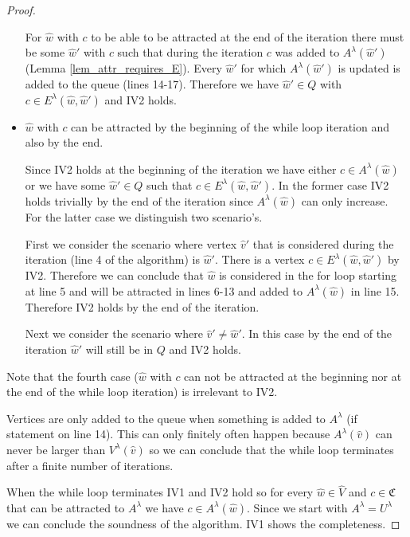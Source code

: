 \begin{theorem}
\begin{proof}
\begin{itemize}
			For $\hat{w}$ with $c$ to be able to be attracted at the end of the iteration there must be some $\hat{w}'$ with $c$ such that during the iteration $c$ was added to $A^\lambda(\hat{w}')$ (Lemma \ref{lem_attr_requires_E}). Every $\hat{w}'$ for which $A^\lambda(\hat{w}')$ is updated is added to the queue (lines 14-17). Therefore we have $\hat{w}' \in Q$ with $c \in E^\lambda(\hat{w},\hat{w}')$ and IV2 holds.
			\item $\hat{w}$ with $c$ can be attracted by the beginning of the while loop iteration and also by the end.
			
			Since IV2 holds at the beginning of the iteration we have either $c \in A^\lambda(\hat{w})$ or we have some $\hat{w}' \in Q$ such that $c \in E^\lambda(\hat{w},\hat{w}')$. In the former case IV2 holds trivially by the end of the iteration since $A^\lambda(\hat{w})$ can only increase. For the latter case we distinguish two scenario's. 
			
			First we consider the scenario where vertex $\hat{v}'$ that is considered during the iteration (line 4 of the algorithm) is $\hat{w}'$. There is a vertex $c \in E^\lambda(\hat{w},\hat{w}')$ by IV2. Therefore we can conclude that $\hat{w}$ is considered in the for loop starting at line 5 and will be attracted in lines 6-13 and added to $A^\lambda(\hat{w})$ in line 15. Therefore IV2 holds by the end of the iteration.
			
			Next we consider the scenario where $\hat{v}' \neq \hat{w}'$. In this case by the end of the iteration $\hat{w}'$ will still be in $Q$ and IV2 holds.
		\end{itemize}
		Note that the fourth case ($\hat{w}$ with $c$ can not be attracted at the beginning nor at the end of the while loop iteration) is irrelevant to IV2.
	
		Vertices are only added to the queue when something is added to $A^\lambda$ (if statement on line 14). This can only finitely often happen because $A^\lambda(\hat{v})$ can never be larger than $V^\lambda(\hat{v})$ so we can conclude that the while loop terminates after a finite number of iterations.
	
		When the while loop terminates IV1 and IV2 hold so for every $\hat{w} \in \hat{V}$ and $c \in \mathfrak{C}$ that can be attracted to $A^\lambda$ we have $c \in A^\lambda(\hat{w})$. Since we start with $A^\lambda = U^\lambda$ we can conclude the soundness of the algorithm. IV1 shows the completeness.
	\end{proof}
\end{theorem}


